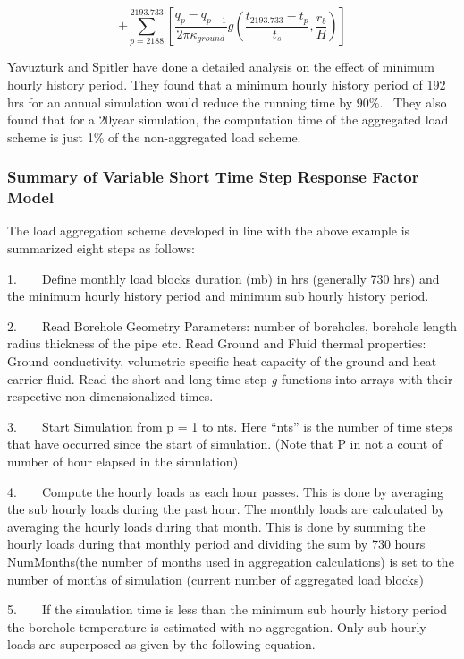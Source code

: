 \begin{equation}
+ \sum\limits_{p = 2188}^{2193.733} {\left[ {\frac{{{q_p} - {q_{p - 1}}}}{{2\pi {\kappa_{ground}}}}g\left( {\frac{{{t_{2193.733}} - {t_p}}}{{{t_s}}},\frac{{{r_b}}}{H}} \right)} \right]}
\end{equation}

Yavuzturk and Spitler have done a detailed analysis on the effect of minimum hourly history period. They found that a minimum hourly history period of 192 hrs for an annual simulation would reduce the running time by 90\%.~ They also found that for a 20year simulation, the computation time of the aggregated load scheme is just 1\% of the non-aggregated load scheme.

\subsubsection{Summary of Variable Short Time Step Response Factor Model}\label{summary-of-variable-short-time-step-response-factor-model}

The load aggregation scheme developed in line with the above example is summarized eight steps as follows:

1.~~~~Define monthly load blocks duration (mb) in hrs (generally 730 hrs) and the minimum hourly history period and minimum sub hourly history period.

2.~~~~Read Borehole Geometry Parameters: number of boreholes, borehole length radius thickness of the pipe etc. Read Ground and Fluid thermal properties: Ground conductivity, volumetric specific heat capacity of the ground and heat carrier fluid. Read the short and long time-step \emph{g-}functions into arrays with their respective non-dimensionalized times.

3.~~~~Start Simulation from p = 1 to nts. Here ``nts'' is the number of time steps that have occurred since the start of simulation. (Note that P in not a count of number of hour elapsed in the simulation)

4.~~~~Compute the hourly loads as each hour passes. This is done by averaging the sub hourly loads during the past hour. The monthly loads are calculated by averaging the hourly loads during that month. This is done by summing the hourly loads during that monthly period and dividing the sum by 730 hours NumMonths(the number of months used in aggregation calculations) is set to the number of months of simulation (current number of aggregated load blocks)

5.~~~~If the simulation time is less than the minimum sub hourly history period the borehole temperature is estimated with no aggregation. Only sub hourly loads are superposed as given by the following equation.

